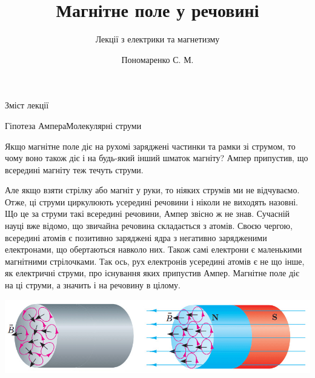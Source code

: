 \documentclass[onlytextwidth]{beamer}
\title[Лекції електрики та магнетизму]{\huge\bfseries Магнітне поле у речовині}
\subtitle{Лекції з електрики та магнетизму}
\author{Пономаренко С. М.}
\date{}
\begin{document}
\begin{frame}[plain]
	\maketitle
\end{frame}

\begin{frame}{Зміст лекції}{}
	\tableofcontents
\end{frame}


\begin{frame}{Гіпотеза Ампера}{Молекулярні струми}
	\begin{block}{}\justifying
		Якщо магнітне поле діє на рухомі заряджені частинки та рамки зі струмом, то \alert{чому воно також діє і на будь-який інший
			шматок магніту}? Ампер припустив, що \alert{всередині магніту теж течуть струми}.
	\end{block}


	\begin{block}{}\justifying\scriptsize
		Але якщо взяти стрілку або магніт у руки, то ніяких струмів ми не відчуваємо. Отже,  ці струми циркулюють усередині речовини і
		ніколи не виходять назовні. Що це за струми такі всередині речовини, Ампер звісно ж не знав. Сучасній науці вже відомо, що звичайна речовина
		складається з атомів. Своєю чергою, всередині атомів є позитивно заряджені ядра з негативно зарядженими електронами, що обертаються навколо них.
		Також самі електрони є маленькими магнітними стрілочками. Так
		ось, рух електронів усередині атомів є не що інше, як електричні струми, про існування яких припустив Ампер. Магнітне поле діє на ці струми, а
		значить і на речовину в цілому.
	\end{block}


	\begin{center}
		\includegraphics[width=1\linewidth]{AmpereHypotesis}
	\end{center}

\end{frame}
\end{document}

